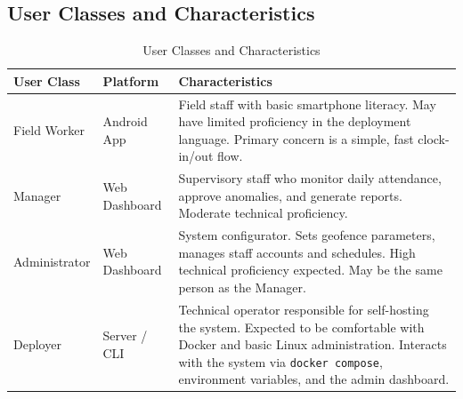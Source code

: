 \documentclass[12pt, a4paper]{article}
\begin{document}
\newpage
\subsection{User Classes and Characteristics}
\begin{table}[h!]
    \centering
    \caption{User Classes and Characteristics}
    \label{tab:users}
    \begin{tabularx}{\linewidth}{@{} l l X @{}}
        \toprule
        \textbf{User Class} & \textbf{Platform} & \textbf{Characteristics} \\
        \midrule
        Field Worker  & Android App      & Field staff with basic smartphone
                                           literacy. May have limited proficiency
                                           in the deployment language. Primary
                                           concern is a simple, fast clock-in/out
                                           flow. \\
        \midrule
        Manager       & Web Dashboard    & Supervisory staff who monitor daily
                                           attendance, approve anomalies, and
                                           generate reports. Moderate technical
                                           proficiency. \\
        \midrule
        Administrator & Web Dashboard    & System configurator. Sets geofence
                                           parameters, manages staff accounts and
                                           schedules. High technical proficiency
                                           expected. May be the same person as
                                           the Manager. \\
        \midrule
        Deployer      & Server / CLI     & Technical operator responsible for
                                           self-hosting the system. Expected to
                                           be comfortable with Docker and basic
                                           Linux administration. Interacts with
                                           the system via \texttt{docker compose},
                                           environment variables, and the admin
                                           dashboard. \\
        \bottomrule
    \end{tabularx}
\end{table}
\end{document}
